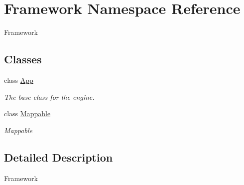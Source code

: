 \hypertarget{namespaceFramework}{
\section{Framework Namespace Reference}
\label{namespaceFramework}
}


Framework  
\subsection*{Classes}
\begin{DoxyCompactItemize}
\item 
class \hyperlink{classFramework_1_1App}{App}
\begin{DoxyCompactList}\small\item\em The base class for the engine. \item\end{DoxyCompactList}\item 
class \hyperlink{classFramework_1_1Mappable}{Mappable}
\begin{DoxyCompactList}\small\item\em Mappable \item\end{DoxyCompactList}\end{DoxyCompactItemize}


\subsection{Detailed Description}
Framework 